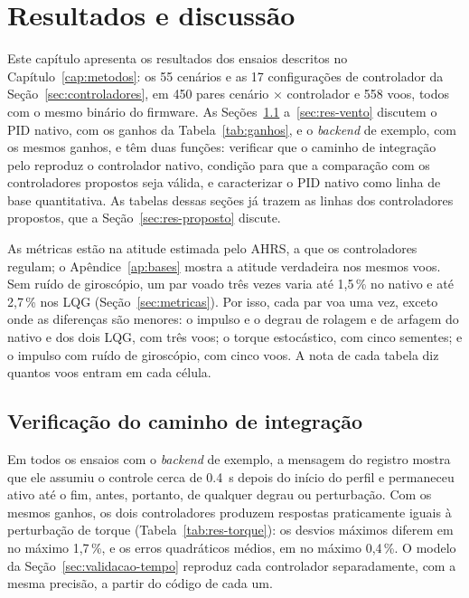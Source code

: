 %
\chapter{Resultados e discussão}
\label{cap:resultados}

Este capítulo apresenta os resultados dos ensaios descritos no
Capítulo~\ref{cap:metodos}: os 55 cenários e as 17 configurações de
controlador da Seção~\ref{sec:controladores}, em 450 pares cenário ×
controlador e 558 voos, todos com o mesmo binário do firmware. As
Seções~\ref{sec:res-integracao} a~\ref{sec:res-vento} discutem o PID nativo,
com os ganhos da Tabela~\ref{tab:ganhos}, e o \textit{backend} de exemplo,
com os mesmos ganhos, e têm duas funções: verificar que o caminho de
integração pelo  reproduz o controlador nativo,
condição para que a comparação com os controladores propostos seja válida, e
caracterizar o PID nativo como linha de base quantitativa. As tabelas dessas
seções já trazem as linhas dos controladores propostos, que a
Seção~\ref{sec:res-proposto} discute.

As métricas estão na atitude estimada pelo AHRS, a que os controladores
regulam; o Apêndice~\ref{ap:bases} mostra a atitude verdadeira nos mesmos
voos. Sem ruído de giroscópio, um par voado três vezes varia até 1,5\,\% no
nativo e até 2,7\,\% nos LQG (Seção~\ref{sec:metricas}). Por isso, cada par
voa uma vez, exceto onde as diferenças são menores: o impulso e o degrau de
rolagem e de arfagem do nativo e dos dois LQG, com três voos; o torque
estocástico, com cinco sementes; e o impulso com ruído de giroscópio, com
cinco voos. A nota de cada tabela diz quantos voos entram em cada célula.

\section{Verificação do caminho de integração}
\label{sec:res-integracao}

Em todos os ensaios com o \textit{backend} de exemplo, a mensagem
 do registro mostra que ele assumiu o controle cerca de
\SI{0.4}{\second} depois do início do perfil e permaneceu ativo até o fim,
antes, portanto, de qualquer degrau ou perturbação. Com os mesmos ganhos, os
dois controladores produzem respostas praticamente iguais à perturbação de
torque (Tabela~\ref{tab:res-torque}): os desvios máximos diferem em no
máximo 1,7\,\%, e os erros quadráticos médios, em no máximo 0,4\,\%. O
modelo da Seção~\ref{sec:validacao-tempo} reproduz cada controlador
separadamente, com a mesma precisão, a partir do código de cada um.

